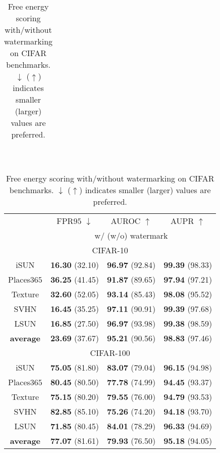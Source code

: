 \documentclass{article}
\begin{document}
\begin{table}[t]
{{\begin{tabular}{c|ccc}
\end{tabular}
}}~~~~
\parbox{.47\linewidth}{
\centering
\caption{Free energy scoring with/without watermarking on CIFAR benchmarks. $\downarrow$ ($\uparrow$) indicates smaller (larger) values are preferred.} \label{tab: free energy}
\vspace{5pt}
\scriptsize{
\begin{tabular}{c|ccc}
\toprule[1.5pt]
                   & FPR$95$ $\downarrow$     & AUROC $\uparrow$       & AUPR $\uparrow$      \\
                   \cline{2-4} 
\multirow{-2}{*}{} & \multicolumn{3}{c}{w/ (w/o) watermark} \\
\midrule[0.6pt]
\multicolumn{4}{c}{\cellcolor{greyL}CIFAR-10} \\
\midrule[0.6pt]
iSUN               & \textbf{16.30} (32.10) & \textbf{96.97} (92.84) & \textbf{99.39} (98.33) \\
Places$365$          & \textbf{36.25} (41.45) & \textbf{91.87} (89.65) & \textbf{97.94} (97.21) \\
Texture            & \textbf{32.60} (52.05) & \textbf{93.14} (85.43) & \textbf{98.08} (95.52) \\
SVHN               & \textbf{16.45} (35.25) & \textbf{97.11} (90.91) & \textbf{99.39} (97.68) \\
LSUN             & \textbf{16.85} (27.50) & \textbf{96.97} (93.98) & \textbf{99.38} (98.59) \\
\midrule
\textbf{average}   & \textbf{23.69} (37.67) & \textbf{95.21} (90.56) & \textbf{98.83} (97.46) \\ \midrule[1pt]
\multicolumn{4}{c}{\cellcolor{greyL}CIFAR-100} \\
\midrule[1pt]
iSUN               & \textbf{75.05} (81.80) & \textbf{83.07} (79.04) & \textbf{96.15} (94.98) \\ 
Places$365$          & \textbf{80.45} (80.50) & \textbf{77.78} (74.99) & \textbf{94.45} (93.37) \\
Texture            & \textbf{75.15} (80.20) & \textbf{79.55} (76.00) & \textbf{94.79} (93.53) \\
SVHN               & \textbf{82.85} (85.10) & \textbf{75.26} (74.20) & \textbf{94.18} (93.70) \\
LSUN             & \textbf{71.85} (80.45) & \textbf{84.01} (78.29) & \textbf{96.33} (94.69) \\
\midrule
\textbf{average}   & \textbf{77.07} (81.61) & \textbf{79.93} (76.50) & \textbf{95.18} (94.05) \\ \bottomrule[1.5pt]      
\end{tabular}
}}
\end{table}
\end{document}
